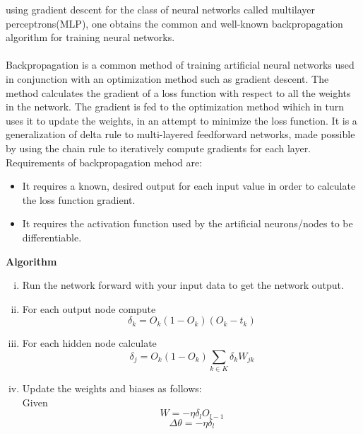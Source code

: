{using gradient descent for the class of neural networks called multilayer perceptrons(MLP), one obtains the common and well-known backpropagation algorithm for training neural networks.\\
\\
Backpropagation is a common method of training artificial neural networks used in conjunction with an optimization method such as gradient descent. The 
method calculates the gradient of a loss function with respect to all the weights in the network. The gradient is fed to the optimization method wihich in turn uses it to
update the weights, in an attempt to minimize the loss function. It is a generalization of delta rule to multi-layered feedforward networks, made possible
by using the chain rule to iteratively compute gradients for each layer. Requirements of backpropagation mehod are:
\begin{itemize}
        \item It requires a known, desired output for each input value in order to calculate the loss function gradient.
        \item It requires the activation function used by the artificial neurons/nodes to be differentiable.
\end{itemize}
\textbf{Algorithm}
\begin{enumerate}[(i)]
        \item Run the network forward with your input data to get the network output.
        \item For each output node compute
                \begin{equation}
                        \delta_k = O_k(1 - O_k)(O_k - t_k)
                \end{equation}
        \item For each hidden node calculate
                \begin{equation}
                        \delta_j = O_k(1 - O_k) \sum_{k \in K}{\delta_kW_{jk}}
                \end{equation}
        \item Update the weights and biases as follows:\\
                Given
                \begin{equation}
                        W = -\eta \delta_l O_{l-1}
                \end{equation}
                \begin{equation}
                        \Delta \theta = -\eta \delta_l
                \end{equation}

\end{enumerate}}
